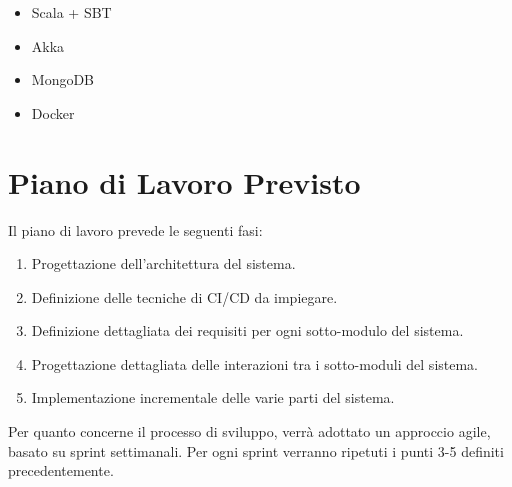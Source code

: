 \documentclass[12pt,a4paper,openright,twoside]{book}
\begin{document}
\begin{itemize}
    \item Scala + SBT
    \item Akka
    \item MongoDB
    \item Docker
\end{itemize}

\chapter{Piano di Lavoro Previsto}
\label{chap:expectedWorkPlan}

Il piano di lavoro prevede le seguenti fasi:

\begin{enumerate}
    \item Progettazione dell'architettura del sistema.
    \item Definizione delle tecniche di CI/CD da impiegare.
    \item Definizione dettagliata dei requisiti per ogni sotto-modulo del sistema.
    \item Progettazione dettagliata delle interazioni tra i sotto-moduli del sistema.
    \item Implementazione incrementale delle varie parti del sistema.
\end{enumerate}

Per quanto concerne il processo di sviluppo, verrà adottato un approccio agile, basato su sprint settimanali. Per ogni sprint verranno ripetuti i punti 3-5 definiti precedentemente.


%
%
\end{document}
